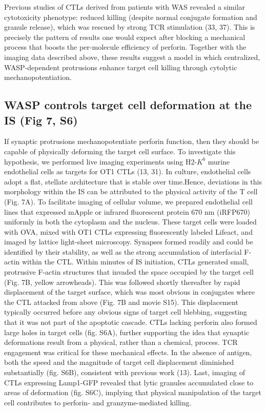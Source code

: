 Previous studies of CTLs derived from patients with WAS revealed a similar cytotoxicity phenotype: reduced killing (despite normal conjugate formation and granule release), which was rescued by strong TCR stimulation (33, 37). This is precisely the pattern of results one would expect after blocking a mechanical process that boosts the per-molecule efficiency of perforin. Together with the imaging data described above, these results suggest a model in which centralized, WASP-dependent protrusions enhance target cell killing through cytolytic mechanopotentiation.

\subsection{WASP controls target cell deformation at the IS (Fig 7, S6)}
If synaptic protrusions mechanopotentiate perforin function, then they should be capable of physically deforming the target cell surface. To investigate this hypothesis, we performed live imaging experiments using H2-$K^{b}$ murine endothelial cells as targets for OT1 CTLs (13, 31). In culture, endothelial cells adopt a flat, stellate architecture that is stable over time.Hence, deviations in this morphology within the IS can be attributed to the physical activity of the T cell (Fig. 7A). To facilitate imaging of cellular volume, we prepared endothelial cell lines that expressed mApple or infrared fluorescent protein 670 nm (iRFP670) uniformly in both the cytoplasm and the nucleus. These target cells were loaded with OVA, mixed with OT1 CTLs expressing fluorescently labeled Lifeact, and imaged by lattice light-sheet microscopy. Synapses formed readily and could be identified by their stability, as well as the strong accumulation of interfacial F-actin within the CTL. Within minutes of IS initiation, CTLs generated small, protrusive F-actin structures that invaded the space occupied by the target cell (Fig. 7B, yellow arrowheads). This was followed shortly thereafter by rapid displacement of the target surface, which was most obvious in conjugates where the CTL attacked from above (Fig. 7B and movie S15). This displacement typically occurred before any obvious signs of target cell blebbing, suggesting that it was not part of the apoptotic cascade. CTLs lacking perforin also formed large holes in target cells (fig. S6A), further supporting the idea that synaptic deformations result from a physical, rather than a chemical, process. TCR engagement was critical for these mechanical effects. In the absence of antigen, both the speed and the magnitude of target cell displacement diminished substantially (fig. S6B), consistent with previous work (13). Last, imaging of CTLs expressing Lamp1-GFP revealed that lytic granules accumulated close to areas of deformation (fig. S6C), implying that physical manipulation of the target cell contributes to perforin- and granzyme-mediated killing.

